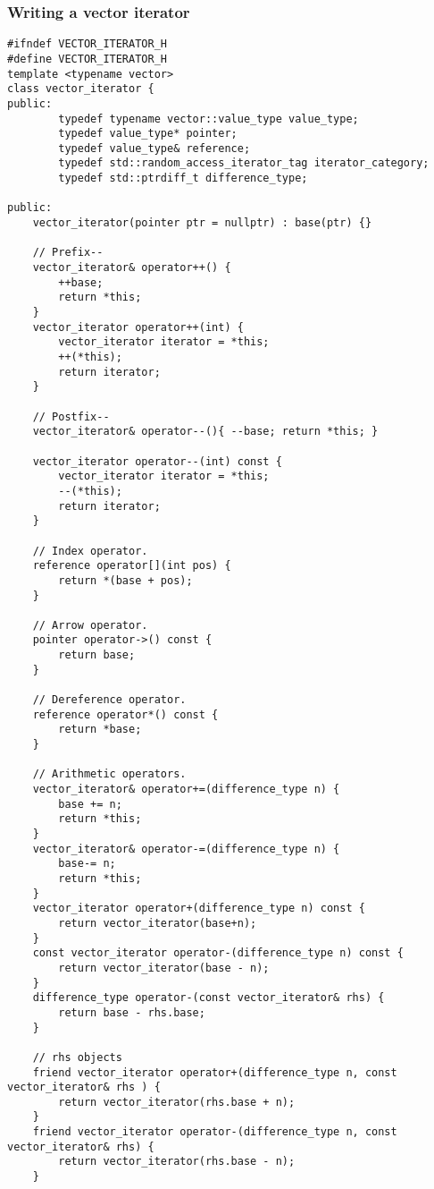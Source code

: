 \documentclass{report}
\begin{document}
\subsubsection{Writing a vector iterator} 
\begin{verbatim}
#ifndef VECTOR_ITERATOR_H
#define VECTOR_ITERATOR_H
template <typename vector>
class vector_iterator {
public:
        typedef typename vector::value_type value_type;
        typedef value_type* pointer;
        typedef value_type& reference;
        typedef std::random_access_iterator_tag iterator_category;
        typedef std::ptrdiff_t difference_type;

public:
    vector_iterator(pointer ptr = nullptr) : base(ptr) {}

    // Prefix-- 
    vector_iterator& operator++() {
        ++base;
        return *this;
    }
    vector_iterator operator++(int) { 
        vector_iterator iterator = *this;
        ++(*this);
        return iterator;
    }

    // Postfix--
    vector_iterator& operator--(){ --base; return *this; }

    vector_iterator operator--(int) const { 
        vector_iterator iterator = *this;
        --(*this);
        return iterator;
    }

    // Index operator.
    reference operator[](int pos) {
        return *(base + pos);
    }

    // Arrow operator.
    pointer operator->() const {
        return base;
    }

    // Dereference operator.
    reference operator*() const {
        return *base;
    }

    // Arithmetic operators.  
    vector_iterator& operator+=(difference_type n) {
        base += n;
        return *this;
    }
    vector_iterator& operator-=(difference_type n) {
        base-= n;
        return *this;
    }
    vector_iterator operator+(difference_type n) const {
        return vector_iterator(base+n);
    }
    const vector_iterator operator-(difference_type n) const {
        return vector_iterator(base - n);
    }
    difference_type operator-(const vector_iterator& rhs) {
        return base - rhs.base;
    }

    // rhs objects
    friend vector_iterator operator+(difference_type n, const vector_iterator& rhs ) {
        return vector_iterator(rhs.base + n);
    }
    friend vector_iterator operator-(difference_type n, const vector_iterator& rhs) {
        return vector_iterator(rhs.base - n);
    }


\end{verbatim}
\end{document}
